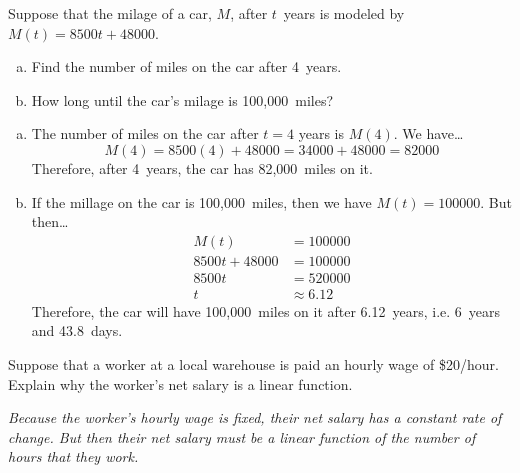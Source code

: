 \documentclass[12pt,letterpaper]{exam}
\begin{document}
\examtitle
{} 
\scores
\newpage

\begin{questions}

\newpage
\question[10] Suppose that the milage of a car, $M$, after $t$~years is modeled by $M(t)= 8500t + 48000$. 
	\begin{enumerate}[(a)]
	\item Find the number of miles on the car after 4~years.
	\item How long until the car's milage is 100,000~miles?
	\end{enumerate} \pspace

{\itshape
\sol 
\begin{enumerate}[(a)]
\item The number of miles on the car after $t= 4$ years is $M(4)$. We have\dots
	\[
	M(4)= 8500(4) + 48000= 34000 + 48000= 82000
	\]
Therefore, after 4~years, the car has 82,000~miles on it. \pspace

\item If the millage on the car is 100,000~miles, then we have $M(t)= 100000$. But then\dots
	\[
	\begin{aligned}
	M(t)&= 100000 \\[0.3cm]
	8500t + 48000&= 100000 \\[0.3cm]
	8500t&= 520000 \\[0.3cm]
	t&\approx 6.12
	\end{aligned}
	\]
Therefore, the car will have 100,000~miles on it after 6.12~years, i.e. 6~years and 43.8~days.  
\end{enumerate}
}



\newpage
\question[10] Suppose that a worker at a local warehouse is paid an hourly wage of \$20/hour. Explain why the worker's net salary is a linear function. \pspace

{\itshape
\sol Because the worker's hourly wage is fixed, their net salary has a constant rate of change. But then their net salary must be a linear function of the number of hours that they work. 
}




\end{questions}
\end{document}
